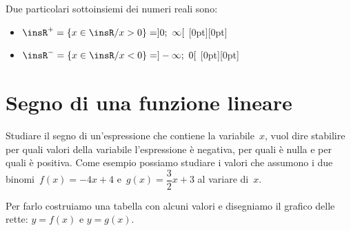 \begin{esempio}
Due particolari sottoinsiemi dei numeri reali sono:

\begin{itemize} [noitemsep]
\item \(\insR^{+}=\{x\in \insR/x>0\} = ]0;~\infty[\) \hspace{15mm}
\raisebox{-9pt}[0pt][0pt]{} 
\item \(\insR^{-}=\{x\in \insR/x<0\} = ]- \infty;~0[\) \hspace{11mm}
\raisebox{-9pt}[0pt][0pt]{} 
\end{itemize}
\end{esempio}


\section{Segno di una funzione lineare}
\label{sec:dis_binomio}

Studiare il segno di un'espressione che contiene la variabile~\(x\), vuol 
dire stabilire per quali valori della variabile l'espressione è negativa, per 
quali è nulla  e per quali è positiva.
Come esempio possiamo studiare i valori che assumono i due 
binomi~\(f(x) = -4 x +4\) e~\(g(x) = \dfrac{3}{2} x +3\) al variare di~\(x\).

Per farlo costruiamo una tabella con alcuni valori e disegniamo il grafico 
delle rette: \quad \(y=f(x)\) e \(y=g(x)\).

